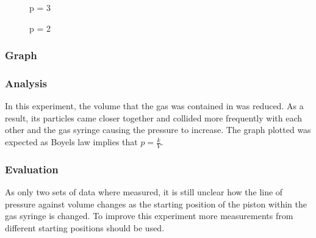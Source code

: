 \begin{figure*}
  \begin{subfigure}{0.5\linewidth}
    \centering
    \caption{p = 3}
  \end{subfigure}
  \hfill
  \begin{subfigure}{0.5\linewidth}
    \centering
    \caption{p = 2}
  \end{subfigure}
\end{figure*}

\subsubsection{Graph}
\begin{figure}[H]
  \centering
\end{figure}

\subsubsection{Analysis}
In this experiment, the volume that the gas was contained in was reduced. As a result, its particles came closer together and collided more frequently with each other and the gas syringe causing the pressure to increase. The graph plotted was expected as Boyels law implies that $p=\frac{k}{V}$.
\subsubsection{Evaluation}
As only two sets of data where measured, it is still unclear how the line of pressure against volume changes as the starting position of the piston within the gas syringe is changed. To improve this experiment more measurements from different starting positions should be used.

